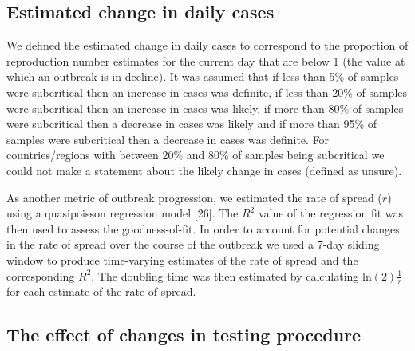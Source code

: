 \documentclass[
]{article}
\begin{document}
\hypertarget{estimated-change-in-daily-cases}{%
\subsection{Estimated change in daily
cases}\label{estimated-change-in-daily-cases}}

We defined the estimated change in daily cases to correspond to the
proportion of reproduction number estimates for the current day that are
below 1 (the value at which an outbreak is in decline). It was assumed
that if less than 5\% of samples were subcritical then an increase in
cases was definite, if less than 20\% of samples were subcritical then
an increase in cases was likely, if more than 80\% of samples were
subcritical then a decrease in cases was likely and if more than 95\% of
samples were subcritical then a decrease in cases was definite. For
countries/regions with between 20\% and 80\% of samples being
subcritical we could not make a statement about the likely change in
cases (defined as unsure).

As another metric of outbreak progression, we estimated the rate of
spread (\(r\)) using a quasipoisson regression model {[}26{]}. The
\(R^2\) value of the regression fit was then used to assess the
goodness-of-fit. In order to account for potential changes in the rate
of spread over the course of the outbreak we used a 7-day sliding window
to produce time-varying estimates of the rate of spread and the
corresponding \(R^2\). The doubling time was then estimated by
calculating \(\text{ln}(2) \frac{1}{r}\) for each estimate of the rate
of spread.

\hypertarget{the-effect-of-changes-in-testing-procedure}{%
\subsection{The effect of changes in testing
procedure}\label{the-effect-of-changes-in-testing-procedure}}
\end{document}
